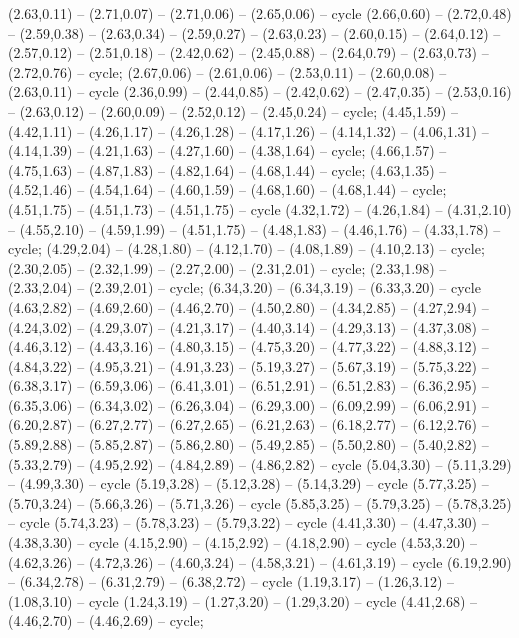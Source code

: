 { (2.63,0.11) -- (2.71,0.07) -- (2.71,0.06) -- (2.65,0.06) -- cycle (2.66,0.60) -- (2.72,0.48) -- (2.59,0.38) -- (2.63,0.34) -- (2.59,0.27) -- (2.63,0.23) -- (2.60,0.15) -- (2.64,0.12) -- (2.57,0.12) -- (2.51,0.18) -- (2.42,0.62) -- (2.45,0.88) -- (2.64,0.79) -- (2.63,0.73) -- (2.72,0.76) -- cycle;
 (2.67,0.06) -- (2.61,0.06) -- (2.53,0.11) -- (2.60,0.08) -- (2.63,0.11) -- cycle (2.36,0.99) -- (2.44,0.85) -- (2.42,0.62) -- (2.47,0.35) -- (2.53,0.16) -- (2.63,0.12) -- (2.60,0.09) -- (2.52,0.12) -- (2.45,0.24) -- cycle;
 (4.45,1.59) -- (4.42,1.11) -- (4.26,1.17) -- (4.26,1.28) -- (4.17,1.26) -- (4.14,1.32) -- (4.06,1.31) -- (4.14,1.39) -- (4.21,1.63) -- (4.27,1.60) -- (4.38,1.64) -- cycle;
 (4.66,1.57) -- (4.75,1.63) -- (4.87,1.83) -- (4.82,1.64) -- (4.68,1.44) -- cycle;
 (4.63,1.35) -- (4.52,1.46) -- (4.54,1.64) -- (4.60,1.59) -- (4.68,1.60) -- (4.68,1.44) -- cycle;
 (4.51,1.75) -- (4.51,1.73) -- (4.51,1.75) -- cycle (4.32,1.72) -- (4.26,1.84) -- (4.31,2.10) -- (4.55,2.10) -- (4.59,1.99) -- (4.51,1.75) -- (4.48,1.83) -- (4.46,1.76) -- (4.33,1.78) -- cycle;
 (4.29,2.04) -- (4.28,1.80) -- (4.12,1.70) -- (4.08,1.89) -- (4.10,2.13) -- cycle;
 (2.30,2.05) -- (2.32,1.99) -- (2.27,2.00) -- (2.31,2.01) -- cycle;
 (2.33,1.98) -- (2.33,2.04) -- (2.39,2.01) -- cycle;
 (6.34,3.20) -- (6.34,3.19) -- (6.33,3.20) -- cycle (4.63,2.82) -- (4.69,2.60) -- (4.46,2.70) -- (4.50,2.80) -- (4.34,2.85) -- (4.27,2.94) -- (4.24,3.02) -- (4.29,3.07) -- (4.21,3.17) -- (4.40,3.14) -- (4.29,3.13) -- (4.37,3.08) -- (4.46,3.12) -- (4.43,3.16) -- (4.80,3.15) -- (4.75,3.20) -- (4.77,3.22) -- (4.88,3.12) -- (4.84,3.22) -- (4.95,3.21) -- (4.91,3.23) -- (5.19,3.27) -- (5.67,3.19) -- (5.75,3.22) -- (6.38,3.17) -- (6.59,3.06) -- (6.41,3.01) -- (6.51,2.91) -- (6.51,2.83) -- (6.36,2.95) -- (6.35,3.06) -- (6.34,3.02) -- (6.26,3.04) -- (6.29,3.00) -- (6.09,2.99) -- (6.06,2.91) -- (6.20,2.87) -- (6.27,2.77) -- (6.27,2.65) -- (6.21,2.63) -- (6.18,2.77) -- (6.12,2.76) -- (5.89,2.88) -- (5.85,2.87) -- (5.86,2.80) -- (5.49,2.85) -- (5.50,2.80) -- (5.40,2.82) -- (5.33,2.79) -- (4.95,2.92) -- (4.84,2.89) -- (4.86,2.82) -- cycle (5.04,3.30) -- (5.11,3.29) -- (4.99,3.30) -- cycle (5.19,3.28) -- (5.12,3.28) -- (5.14,3.29) -- cycle (5.77,3.25) -- (5.70,3.24) -- (5.66,3.26) -- (5.71,3.26) -- cycle (5.85,3.25) -- (5.79,3.25) -- (5.78,3.25) -- cycle (5.74,3.23) -- (5.78,3.23) -- (5.79,3.22) -- cycle (4.41,3.30) -- (4.47,3.30) -- (4.38,3.30) -- cycle (4.15,2.90) -- (4.15,2.92) -- (4.18,2.90) -- cycle (4.53,3.20) -- (4.62,3.26) -- (4.72,3.26) -- (4.60,3.24) -- (4.58,3.21) -- (4.61,3.19) -- cycle (6.19,2.90) -- (6.34,2.78) -- (6.31,2.79) -- (6.38,2.72) -- cycle (1.19,3.17) -- (1.26,3.12) -- (1.08,3.10) -- cycle (1.24,3.19) -- (1.27,3.20) -- (1.29,3.20) -- cycle (4.41,2.68) -- (4.46,2.70) -- (4.46,2.69) -- cycle;
}
